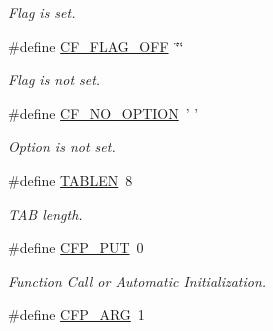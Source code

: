 \begin{DoxyCompactItemize}
\begin{DoxyCompactList}\small\item\em Flag is set. \end{DoxyCompactList}\item 
\hypertarget{group__cflib__core_ga7010abac2c80c121772da4d9c03332ee}{\#define \hyperlink{group__cflib__core_ga7010abac2c80c121772da4d9c03332ee}{C\-F\-\_\-\-F\-L\-A\-G\-\_\-\-O\-F\-F}~\char`\"{}\char`\"{}}\label{group__cflib__core_ga7010abac2c80c121772da4d9c03332ee}

\begin{DoxyCompactList}\small\item\em Flag is not set. \end{DoxyCompactList}\item 
\hypertarget{group__cflib__core_gabea45e34341ee5aaafb4a4a732bb5ece}{\#define \hyperlink{group__cflib__core_gabea45e34341ee5aaafb4a4a732bb5ece}{C\-F\-\_\-\-N\-O\-\_\-\-O\-P\-T\-I\-O\-N}~' '}\label{group__cflib__core_gabea45e34341ee5aaafb4a4a732bb5ece}

\begin{DoxyCompactList}\small\item\em Option is not set. \end{DoxyCompactList}\item 
\hypertarget{group__cflib__core_ga9c80120944556169d230d4cd051d88cb}{\#define \hyperlink{group__cflib__core_ga9c80120944556169d230d4cd051d88cb}{T\-A\-B\-L\-E\-N}~8}\label{group__cflib__core_ga9c80120944556169d230d4cd051d88cb}

\begin{DoxyCompactList}\small\item\em T\-A\-B length. \end{DoxyCompactList}\item 
\hypertarget{group__cflib__core_ga764a8ea81ffc3940bf413797dcaf9a3d}{\#define \hyperlink{group__cflib__core_ga764a8ea81ffc3940bf413797dcaf9a3d}{C\-F\-P\-\_\-\-P\-U\-T}~0}\label{group__cflib__core_ga764a8ea81ffc3940bf413797dcaf9a3d}

\begin{DoxyCompactList}\small\item\em Function Call or Automatic Initialization. \end{DoxyCompactList}\item 
\hypertarget{group__cflib__core_ga0901da5871f3cffeec56e491f8c9fc7f}{\#define \hyperlink{group__cflib__core_ga0901da5871f3cffeec56e491f8c9fc7f}{C\-F\-P\-\_\-\-A\-R\-G}~1}\label{group__cflib__core_ga0901da5871f3cffeec56e491f8c9fc7f}


\end{DoxyCompactItemize}
